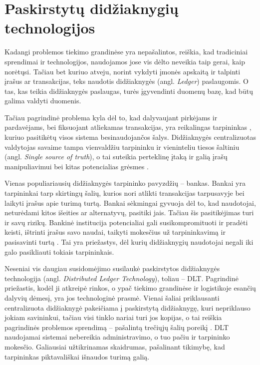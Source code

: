 
\section {Paskirstytų didžiaknygių technologijos}

Kadangi problemos tiekimo grandinėse yra nepašalintos, reiškia, kad tradiciniai sprendimai ir technologijos, naudojamos jose vis dėlto neveikia taip gerai, kaip norėtųsi. Tačiau bet kuriuo atveju, norint vykdyti įmonės apskaitą ir talpinti įrašus ar transakcijas, teks naudotis didžiaknygės (angl. \textit{Ledger}) paslaugomis. O tas, kas teikia didžiaknygės paslaugas, turės įgyvendinti duomenų bazę, kad būtų galima valdyti duomenis.

Tačiau pagrindinė problema kyla dėl to, kad dalyvaujant pirkėjams ir pardavėjams, bei fiksuojant atliekamas transakcijas, yra reikalingas tarpininkas \cite{gao2018coc}, kuriuo pasitikėtų visos sistema besinaudojančos šalys. Didžiaknygės centralizuotas valdytojas savaime tampa vienvaldžiu tarpininku ir vieninteliu tiesos šaltiniu (angl. \textit{Single source of truth}), o tai suteikia perteklinę įtaką ir galią įrašų manipuliavimui bei kitas potencialias grėsmes \cite{jiang2017much} \cite{shyamasundar2018blockchain}. 

Vienas populiariausių didžiaknygės tarpininko pavyzdžių – bankas. Bankai yra tarpininkai tarp skirtingų šalių, kurios nori atlikti transakcijas tarpusavyje bei laikyti įrašus apie turimą turtą. Bankai sėkmingai gyvuoja dėl to, kad naudotojai, neturėdami kitos išeities ar alternatyvų, pasitiki jais. Tačiau šis pasitikėjimas turi ir savų rizikų. Bankinė institucija potencialiai gali susikompromituoti ir pradėti keisti, ištrinti įrašus savo naudai, taikyti mokesčius už tarpininkavimą ir pasisavinti turtą \cite{shyamasundar2018blockchain}. Tai yra priežastys, dėl kurių didžiaknygių naudotojai negali iki galo pasikliauti tokiais tarpininkais.

Neseniai vis daugiau susidomėjimo susilaukė paskirstytos didžiaknygės technologija (angl. \textit{Distributed Ledger Technology}), toliau – DLT. Pagrindinė priežastis, kodėl ji atkreipė rinkos, o ypač tiekimo grandinėse ir logistikoje esančių dalyvių dėmesį, yra jos technologinė prasmė. Vienai šaliai priklausanti centralizuota didžiaknygė pakeičiama į paskirstytą didžiaknygę, kuri nepriklauso jokiam savininkui, tačiau visi tinklo nariai turi jos kopijas, o tai reiškia pagrindinės problemos sprendimą – pašalintą trečiųjų šalių poreikį \cite{shyamasundar2018blockchain}. DLT naudojamai sistemai nebereikia administravimo, o tuo pačiu ir tarpininko mokesčio. Galiausiai užtikrinamas skaidrumas, pašalinant tikimybę, kad tarpininkas piktavališkai išnaudos turimą galią.



